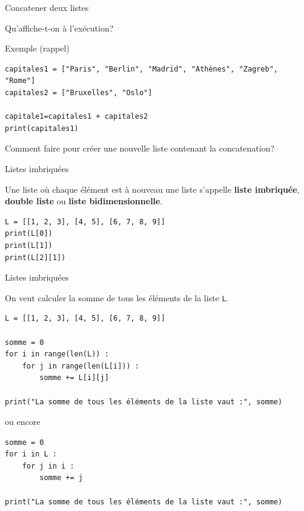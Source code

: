 \documentclass[10pt]{beamer}
\begin{document}
\begin{frame}[fragile]{Concatener deux listes}

Qu'affiche-t-on à l'exécution? 

\vspace{0.5 cm}

\begin{exampleblock}{Exemple (rappel)}
\small{
\begin{verbatim}
capitales1 = ["Paris", "Berlin", "Madrid", "Athènes", "Zagreb", "Rome"]
capitales2 = ["Bruxelles", "Oslo"]

capitale1=capitales1 + capitales2
print(capitales1)  
\end{verbatim}
}
\end{exampleblock}

\vspace{0.5 cm}

Comment faire pour créer une nouvelle liste contenant la concatenation? 

\end{frame}


\begin{frame}[fragile]{Listes imbriquées}

Une liste où chaque élément est à nouveau une liste s'appelle 
\textbf{liste imbriquée}, \textbf{double liste} ou
\textbf{liste bidimensionnelle}.


\vspace{0.5 cm}

\begin{exampleblock}{}
\begin{verbatim}
L = [[1, 2, 3], [4, 5], [6, 7, 8, 9]]
print(L[0])
print(L[1])
print(L[2][1])
\end{verbatim}
\end{exampleblock}
\end{frame}


\begin{frame}[fragile]{Listes imbriquées}

On veut  calculer la somme de tous les éléments de la liste
\texttt{L}.


\begin{exampleblock}{}
\begin{verbatim}
L = [[1, 2, 3], [4, 5], [6, 7, 8, 9]]

somme = 0
for i in range(len(L)) :
    for j in range(len(L[i])) :
        somme += L[i][j]

print("La somme de tous les éléments de la liste vaut :", somme)
\end{verbatim}
\end{exampleblock}

\pause 

ou encore 


\begin{exampleblock}{}
\begin{verbatim}
somme = 0
for i in L :
    for j in i :
        somme += j
        
print("La somme de tous les éléments de la liste vaut :", somme)  
\end{verbatim}
\end{exampleblock}



\end{frame}
\end{document}
